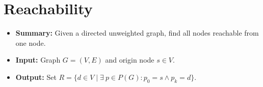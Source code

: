 \section{Reachability} \label{algorithm-reachability}
\begin{itemize}
    \item \textbf{Summary:} Given a directed unweighted graph, find all nodes reachable from one node.
    \item \textbf{Input:} Graph $G=(V,E)$ and origin node $s \in V$.
    \item \textbf{Output:} Set $R=\{d \in V \mid \exists~p \in P(G)\colon p_0 = s \wedge p_k = d\}$.
\end{itemize}


